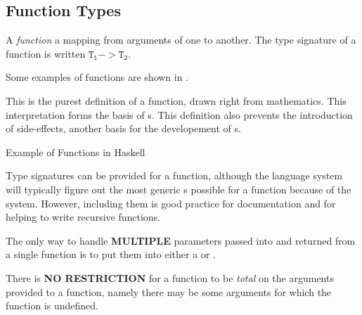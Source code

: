 \subsection{Function Types}\label{subsec:Function_Types}
\begin{definition}[Function]\label{def:Function}
  A \emph{function} a mapping from arguments of one  to another.
  The type signature of a function is written $\mathtt{T_{1}} -> \mathtt{T_{2}}$.

  Some examples of functions are shown in .

  \begin{remark}\label{rmk:Function_Definition_Pureness}
    This is the purest definition of a function, drawn right from mathematics.
    This interpretation forms the basis of s.
    This definition also prevents the introduction of side-effects, another basis for the developement of s.
  \end{remark}
\end{definition}

\begin{listing}[h!tbp]
\caption{Example of Functions in Haskell}
\label{lst:Function_Examples}
\end{listing}

Type signatures can be provided for a function, although the language system will typically figure out the most generic s possible for a function because of the  system.
However, including them is good practice for documentation and for helping to write recursive functions.

\begin{blackbox}
  The only way to handle \textbf{MULTIPLE} parameters passed into and returned from a single function is to put them into either a  or .
\end{blackbox}

\begin{blackbox}
  There is \textbf{NO RESTRICTION} for a function to be \emph{total} on the arguments provided to a function, namely there may be some arguments for which the function is undefined.
\end{blackbox}

